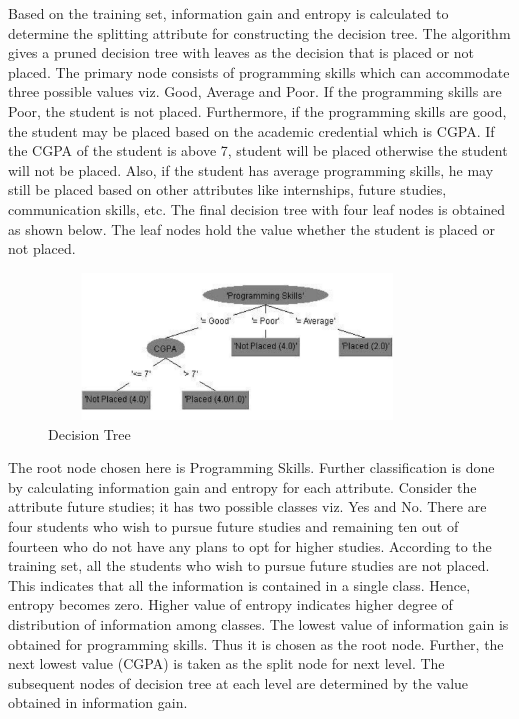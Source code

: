 \documentclass[12pt]{article}
\begin{document}
Based on the training set, information gain and entropy 
is calculated to determine the splitting attribute for 
constructing the decision tree. The algorithm gives a pruned decision tree with leaves as 
the decision that is placed or not placed. The primary node 
consists of programming skills which can accommodate 
three possible values viz. Good, Average and Poor. If the 
programming skills are Poor, the student is not placed. 
Furthermore, if the programming skills are good, the 
student may be placed based on the academic credential 
which is CGPA. If the CGPA of the student is above 7, 
student will be placed otherwise the student will not be 
placed. Also, if the student has average programming 
skills, he may still be placed based on other attributes like 
internships, future studies, communication skills, etc. 
 The final decision tree with four leaf nodes is obtained 
as shown below. The leaf nodes hold the value whether the 
student is placed or not placed.


\begin{figure}[H]
\begin{center}
 \includegraphics[width=10cm, height=3.9cm]{L2P1}
\caption{Decision Tree}
\end{center}
\end{figure}

The root node chosen here is Programming Skills. 
Further classification is done by calculating information 
gain and entropy for each attribute. Consider the attribute future studies; it has two possible 
classes viz. Yes and No. There are four students who wish 
to pursue future studies and remaining ten out of fourteen 
who do not have any plans to opt for higher studies. 
According to the training set, all the students who wish to 
pursue future studies are not placed. This indicates that all 
the information is contained in a single class. Hence, 
entropy becomes zero. Higher value of entropy indicates 
higher degree of distribution of information among classes. 
The lowest value of information gain is obtained for 
programming skills. Thus it is chosen as the root node. 
Further, the next lowest value (CGPA) is taken as the split 
node for next level. The subsequent nodes of decision tree 
at each level are determined by the value obtained in 
information gain.
\end{document}

